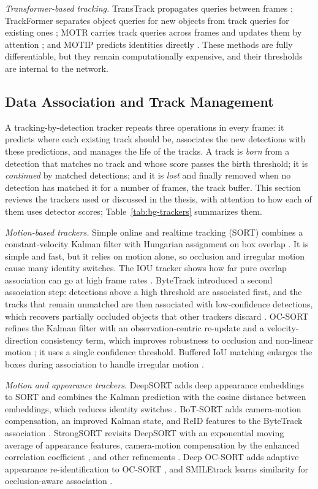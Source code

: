 \emph{Transformer-based tracking.} TransTrack propagates queries between frames \cite{sun2020transtrack}; TrackFormer separates object queries for new objects from track queries for existing ones \cite{meinhardt2022trackformer}; MOTR carries track queries across frames and updates them by attention \cite{zeng2022motr}; and MOTIP predicts identities directly \cite{gao2025motip}. These methods are fully differentiable, but they remain computationally expensive, and their thresholds are internal to the network.

\subsection{Data Association and Track Management}\label{sec:bg-association}
A tracking-by-detection tracker repeats three operations in every frame: it predicts where each existing track should be, associates the new detections with these predictions, and manages the life of the tracks. A track is \emph{born} from a detection that matches no track and whose score passes the birth threshold; it is \emph{continued} by matched detections; and it is \emph{lost} and finally removed when no detection has matched it for a number of frames, the track buffer. This section reviews the trackers used or discussed in the thesis, with attention to how each of them uses detector scores; Table~\ref{tab:bg-trackers} summarizes them.

\emph{Motion-based trackers.} Simple online and realtime tracking (SORT) combines a constant-velocity Kalman filter with Hungarian assignment on box overlap \cite{bewley2016sort}. It is simple and fast, but it relies on motion alone, so occlusion and irregular motion cause many identity switches. The IOU tracker shows how far pure overlap association can go at high frame rates \cite{bochinski2017iou}. ByteTrack introduced a second association step: detections above a high threshold are associated first, and the tracks that remain unmatched are then associated with low-confidence detections, which recovers partially occluded objects that other trackers discard \cite{zhang2022bytetrack}. OC-SORT refines the Kalman filter with an observation-centric re-update and a velocity-direction consistency term, which improves robustness to occlusion and non-linear motion \cite{cao2023ocsort}; it uses a single confidence threshold. Buffered IoU matching enlarges the boxes during association to handle irregular motion \cite{yang2023cbiou}.

\emph{Motion and appearance trackers.} DeepSORT adds deep appearance embeddings to SORT and combines the Kalman prediction with the cosine distance between embeddings, which reduces identity switches \cite{wojke2017deepsort}. BoT-SORT adds camera-motion compensation, an improved Kalman state, and ReID features to the ByteTrack association \cite{aharon2022botsort}. StrongSORT revisits DeepSORT with an exponential moving average of appearance features, camera-motion compensation by the enhanced correlation coefficient \cite{evangelidis2008ecc}, and other refinements \cite{du2023strongsort}. Deep OC-SORT adds adaptive appearance re-identification to OC-SORT \cite{maggiolino2023deepocsort}, and SMILEtrack learns similarity for occlusion-aware association \cite{wang2024smiletrack}.

